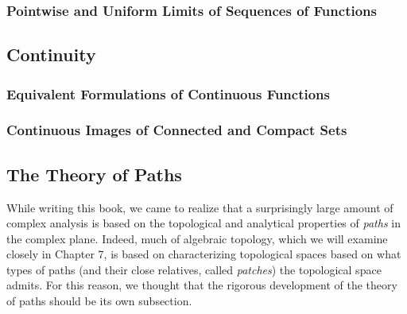 \subsubsection{Pointwise and Uniform Limits of Sequences of Functions}
\subsection{Continuity}
\subsubsection{Equivalent Formulations of Continuous Functions}
\subsubsection{Continuous Images of Connected and Compact Sets}
\subsection{The Theory of Paths}
While writing this book, we came to realize that a surprisingly large amount of complex analysis is based on the topological and analytical properties of \emph{paths} in the complex plane. Indeed, much of algebraic topology, which we will examine closely in Chapter 7, is based on characterizing topological spaces based on what types of paths (and their close relatives, called \emph{patches}) the topological space admits. For this reason, we thought that the rigorous development of the theory of paths should be its own subsection.
